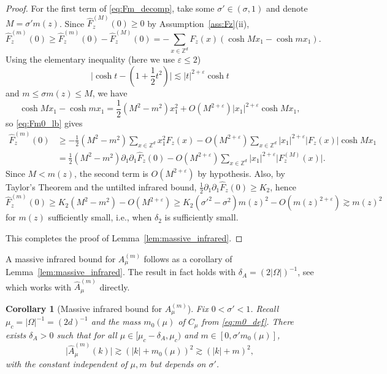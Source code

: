 \documentclass[11pt,hidelinks]{article}
\theoremstyle{plain}
\newtheorem{corollary}[theorem]{Corollary}
\numberwithin{equation}{section}
\newcommand{\ie}{i.e.}
\newcommand{\eps}{\varepsilon}
\newcommand{\Z}{\mathbb{Z}}
\newcommand{\del}{\partial}
\newcommand{\inv}{^{-1}}
\renewcommand{\(}{\left(}
\renewcommand{\)}{\right)}
\newcommand{\half}{\frac{1}{2}}
\newcommand{\1}{\mathds{1}}
\newcommand{\nl}{\nonumber \\}
\providecommand{\abs}[1]{\lvert#1\rvert}
\providecommand{\Bigabs}[1]{\Big\lvert#1\Big\rvert}
\newcommand{\mz}{m(z)}
\newcommand{\supm}{^{(m)}}
\newcommand{\supM}{^{(M)}}
\begin{document}
\begin{proof}
For the first term of \eqref{eq:Fm_decomp}, take some $\sigma' \in (\sigma, 1)$ and denote $M = \sigma' m(z)$. Since $\hat F_z\supM(0) \ge 0$ by Assumption~\ref{ass:Fz}(ii), 
\begin{equation}
\label{eq:Fm0_lb}
\hat F_z\supm(0)
\ge \hat F_z\supm(0) - \hat F_z\supM(0)
= - \sum_{x\in \Z^d} F_z(x) (\cosh Mx_1 - \cosh mx_1). 
\end{equation}
Using the elementary inequality (here we use $\eps\le 2$)
\begin{equation}
\label{eq:cosh3}
\Bigabs{ \cosh t - (1 + \half t^2) } \lesssim \abs t^{2+\eps} \cosh t
\end{equation}
and $m \le \sigma \mz \le M$, we have
\begin{equation}
\cosh Mx_1 - \cosh mx_1
= \half ( M^2 - m^2 ) x_1^2 + O(M^{2+\eps}) \abs{x_1}^{2+\eps} \cosh Mx_1,
\end{equation}
so \eqref{eq:Fm0_lb} gives 
\begin{align}
\hat F_z\supm(0)
&\ge - \half (M^2 - m^2) \sum_{x\in \Z^d} x_1^2 F_z(x) 
	- O(M^{2+\eps})  \sum_{x\in \Z^d} \abs {x_1}^{2+\eps} \abs{ F_z(x) } \cosh Mx_1 \nl
&= \half (M^2 - m^2) \del_1\del_1 \hat F_z(0)
	- O(M^{2+\eps})  \sum_{x\in \Z^d} \abs {x_1}^{2+\eps} \abs{ F_z\supM(x) }. 
\end{align}
Since $M  < m(z)$, the second term is $O(M^{2+\eps})$ by hypothesis. 
Also, by Taylor's Theorem and the untilted infrared bound, $\half \del_1\del_1 \hat F_z(0) \ge K_2$, hence
\begin{equation}
\label{eq:Fm0_lb2}
\hat F_z\supm(0)
\ge K_2 (M^2 - m^2) - O(M^{2+\eps})
\ge K_2 (\sigma'^2 - \sigma^2) \mz^2 - O(\mz^{2+\eps})
\gtrsim m(z)^2
\end{equation}
for $m(z)$ sufficiently small, \ie, when $\delta_2$ is sufficiently small. 

This completes the proof of Lemma~\ref{lem:massive_infrared}.
\end{proof}




A massive infrared bound for $A_\mu\supm$ follows as a corollary of Lemma~\ref{lem:massive_infrared}. The result in fact holds with $\delta_A = (2\abs\Omega)\inv$, see \cite[Lemma~2.2]{Slad23_wsaw} which works with $\hat A_\mu\supm$ directly. 

\begin{corollary} [Massive infrared bound for $A_\mu\supm$]
\label{cor:massive_infrared}
Fix $0 < \sigma' < 1$. 
Recall $\mu_c = \abs\Omega\inv = (2d)\inv$ and the mass $m_0(\mu)$ of $C_\mu$ from \eqref{eq:m0_def}. 
There exists $\delta_A >0$ such that for all $\mu \in [ \mu_c - \delta_A, \mu_c )$ and $m \in [0,\sigma' m_0(\mu)]$, 
\begin{equation} \label{eq:Am_lb}
\abs{ \hat A_\mu \supm (k) } 
\gtrsim (\abs k + m_0(\mu) )^2
\gtrsim (\abs k  + m)^2,
\end{equation}
with the constant independent of $\mu,m$ but depends on $\sigma'$. 
\end{corollary}
\end{document}
